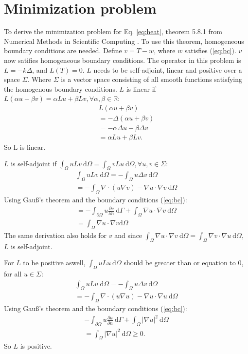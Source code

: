 \section{Minimization problem}
To derive the minimization problem for Eq. \ref{eq:heat}, theorem 5.8.1 from Numerical Methods in Scientific Computing \cite{kan}. To use this theorem, homogeneous boundary conditions are needed. Define $v=T-w$, where $w$ satisfies (\ref{eq:bc}). $v$ now satifies homogeneous boundary conditions. The operator in this problem is $L=-k\Delta$, and $L(T)=0$. $L$ needs to be self-adjoint, linear and positive over a space $\Sigma$. Where $\Sigma$ is a vector space consisting of all smooth functions satisfying the homogenous boundary conditions. $L$ is linear if $L(\alpha u+\beta v)=\alpha Lu+\beta Lv, \forall\alpha,\beta\in\mathbb{R}$:
\begin{gather*}
    L(\alpha u+\beta v)\\
    =-\Delta(\alpha u + \beta v)\\
    =-\alpha\Delta u-\beta \Delta v\\
    = \alpha Lu+\beta Lv.
\end{gather*}So L is linear.

$L$ is self-adjoint if $\int_\Omega uLv~\text{d}\Omega=\int_\Omega vLu~\text{d}\Omega, \forall u,v\in \Sigma$:
\begin{gather*}
    \int_\Omega uLv~\text{d}\Omega = -\int_\Omega u\Delta v~\text{d}\Omega\\
    =-\int_\Omega \nabla \cdot (u\nabla v) - \nabla u\cdot\nabla v~\text{d}\Omega
\end{gather*}
Using Gau\ss's theorem and the boundary conditions (\ref{eq:bc}):
\begin{gather*}
    =-\int_{\partial\Omega} u\frac{\partial v}{\partial n}~\text{d}\Gamma + \int_\Omega \nabla u\cdot\nabla v~\text{d}\Omega\\
    =\int_\Omega \nabla u\cdot \nabla v\text{d}\Omega
\end{gather*}
The same derivation also holds for $v$ and since $\int_\Omega \nabla u\cdot \nabla v~\text{d}\Omega = \int_\Omega \nabla v\cdot \nabla u~\text{d}\Omega$, $L$ is self-adjoint.

For $L$ to be positive aswell, $\int_\Omega uLu~\text{d}\Omega$ should be greater than or equation to 0, for all $u\in \Sigma$:
\begin{gather*}
    \int_\Omega uLu~\text{d}\Omega = - \int_\Omega u\Delta v~\text{d}\Omega\\
    = -\int_\Omega \nabla \cdot(u\nabla u) - \nabla u\cdot\nabla u~\text{d}\Omega
\end{gather*} Using Gau\ss's theorem and the boundary conditions (\ref{eq:bc}):
\begin{gather*}
    -\int_{\partial\Omega} u\frac{\partial u}{\partial n}~\text{d}\Gamma + \int_{\Omega} |\nabla u|^2~\text{d}\Omega \\
    =\int_\Omega |\nabla u|^2~\text{d}\Omega \geq 0.
\end{gather*} So $L$ is positive.

